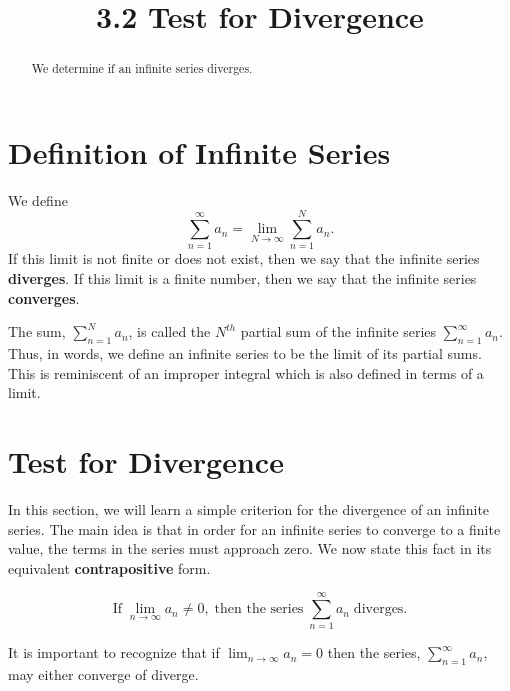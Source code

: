 \documentclass{ximera}
\title{3.2 Test for Divergence}
\begin{document}
\begin{abstract}
We determine if an infinite series diverges.
\end{abstract}

\maketitle

\section{Definition of Infinite Series}

\begin{definition}
We define
\[\sum_{n=1}^\infty a_n = \lim_{N \to \infty} \sum_{n=1}^N a_n.\]
If this limit is not finite or does not exist, then we say that the infinite series \textbf{diverges}.
If this limit is a finite number, then we say that the infinite series \textbf{converges}.
\end{definition}

\begin{remark}
The sum, $\displaystyle{\sum_{n=1}^N a_n}$, is called the $N^{th}$ partial sum of the infinite series
$\displaystyle{\sum_{n=1}^\infty a_n}$. Thus, in words, we define an infinite series to be the limit of its partial sums.
This is reminiscent of an improper integral which is also defined in terms of a limit.
\end{remark}

\section{Test for Divergence}

In this section, we will learn a simple criterion for the divergence of an infinite series.
The main idea is that in order for an infinite series to converge to a finite value, the terms in the series
must approach zero. We now state this fact in its equivalent \textbf{contrapositive} form.


\begin{theorem}


\[
\text{If}  \; \lim_{n\to \infty} a_n \neq 0,
\; \text{then the series} \;
\sum_{n=1}^\infty a_n \;
\text{diverges.}
\]

\end{theorem}

\begin{remark}
It is important to recognize that if $\displaystyle{\lim_{n \to \infty} a_n = 0}$ then the series, $\displaystyle{\sum_{n=1}^\infty a_n}$, may either converge of diverge.
\end{remark}
\end{document}
